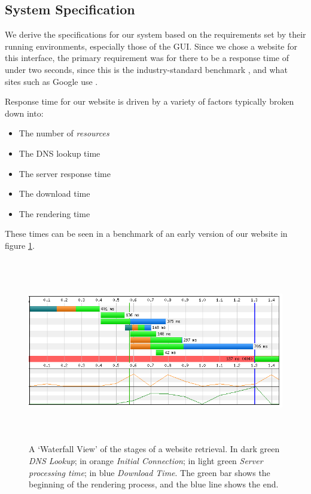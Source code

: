 

\subsection{System Specification}\label{sec-specs}

We derive the specifications for our system based on the requirements
set by their running environments, especially those of the GUI. Since
we chose a website for this interface, the primary requirement was for
there to be a response time of under two seconds, since this is the
industry-standard benchmark \cite{akamai}, and what sites such as
Google use \cite{two-seconds}.

Response time for our website is driven by a variety of factors
typically broken down into:

\begin{itemize}
  \item The number of \emph{resources}
  \item The DNS lookup time
  \item The server response time
  \item The download time
  \item The rendering time
\end{itemize}

These times can be seen in a benchmark of an early version of our
website in figure \ref{fig-website-benchmark}.

\begin{figure}[htp]
  \centering
  \includegraphics[height=8cm]{graphics/performance.png}
  \caption{A `Waterfall View' of the stages of a website retrieval. In
  dark green \emph{DNS Lookup}; in orange \emph{Initial Connection};
  in light green \emph{Server processing time}; in blue \emph{Download
  Time}. The green bar shows the beginning of the rendering process,
and the blue line shows the end.}
  \label{fig-website-benchmark}
\end{figure}

